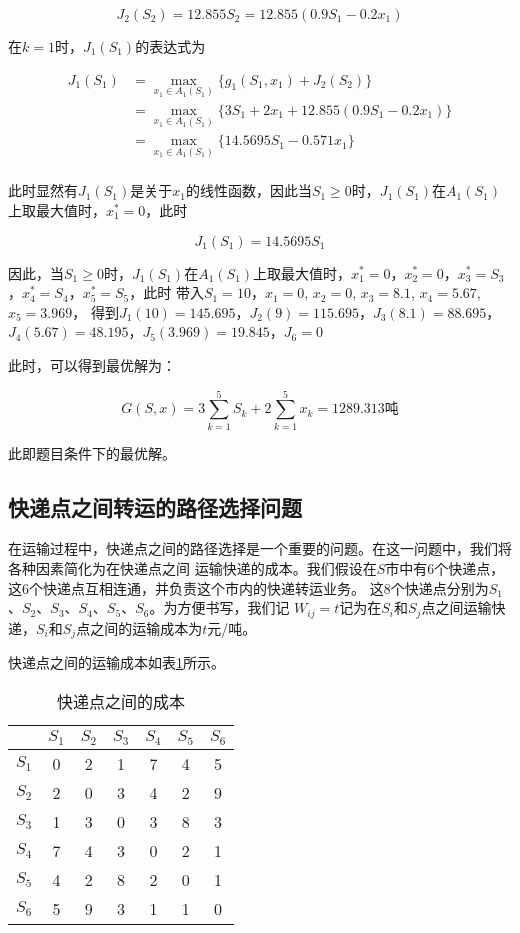 \documentclass[UTF8]{ctexart}
\begin{document}
$$J_2(S_2)=12.855S_2=12.855(0.9S_1-0.2x_1)$$

在$k=1$时，$J_1(S_1)$的表达式为

\begin{equation*}
    \begin{aligned}
        J_1(S_1)&=\max_{x_1\in A_1(S_1)}\{g_1(S_1,x_1)+J_2(S_2)\}\\
                &=\max_{x_1\in A_1(S_1)}\{3S_1+2x_1+12.855(0.9S_1-0.2x_1)\}\\
                &=\max_{x_1\in A_1(S_1)}\{14.5695S_1-0.571x_1\}\\
    \end{aligned}
\end{equation*}

此时显然有$J_1(S_1)$是关于$x_1$的线性函数，因此当$S_1\geq 0$时，$J_1(S_1)$在$A_1(S_1)$上取最大值时，$x_1^*=0$，此时

$$J_1(S_1)=14.5695S_1$$

因此，当$S_1\geq 0$时，$J_1(S_1)$在$A_1(S_1)$上取最大值时，$x_1^*=0$，$x_2^*=0$，$x_3^*=S_3$，$x_4^*=S_4$，$x_5^*=S_5$，此时
带入$S_1=10$，$x_1=0$, $x_2=0$, $x_3=8.1$, $x_4=5.67$, $x_5=3.969$，
得到$J_1(10)=145.695$，$J_2(9)=115.695$，$J_3(8.1)=88.695$，$J_4(5.67)=48.195$，$J_5(3.969)=19.845$，$J_6=0$

此时，可以得到最优解为：

$$G(S,x)=3\sum_{k=1}^{5}S_k+2\sum_{k=1}^{5}x_k=1289.313\text{吨}$$

此即题目条件下的最优解。\cite{食用马尔可夫}

\subsection{快递点之间转运的路径选择问题}

在运输过程中，快递点之间的路径选择是一个重要的问题。在这一问题中，我们将各种因素简化为在快递点之间
运输快递的成本。我们假设在$S$市中有6个快递点，这6个快递点互相连通，并负责这个市内的快递转运业务。
这8个快递点分别为$S_1$、$S_2$、$S_3$、$S_4$、$S_5$、$S_6$。为方便书写，我们记
$W_{ij}=t$记为在$S_i$和$S_j$点之间运输快递，$S_i$和$S_j$点之间的运输成本为$t$元/吨。

快递点之间的运输成本如表\ref{tab:costs}所示。%

\begin{table}[ht]
    \centering
    \caption{快递点之间的成本}
    \begin{tabular}{|c|c|c|c|c|c|c|}
    \hline
        & $S_1$ & $S_2$ & $S_3$ & $S_4$ & $S_5$ & $S_6$ \\ \hline
        $S_1$ & 0 & 2 & 1 & 7 & 4 & 5 \\ \hline
        $S_2$ & 2 & 0 & 3 & 4 & 2 & 9 \\ \hline
        $S_3$ & 1 & 3 & 0 & 3 & 8 & 3 \\ \hline
        $S_4$ & 7 & 4 & 3 & 0 & 2 & 1 \\ \hline
        $S_5$ & 4 & 2 & 8 & 2 & 0 & 1 \\ \hline
        $S_6$ & 5 & 9 & 3 & 1 & 1 & 0 \\ \hline
    \end{tabular}
    \label{tab:costs}
\end{table}
\end{document}

